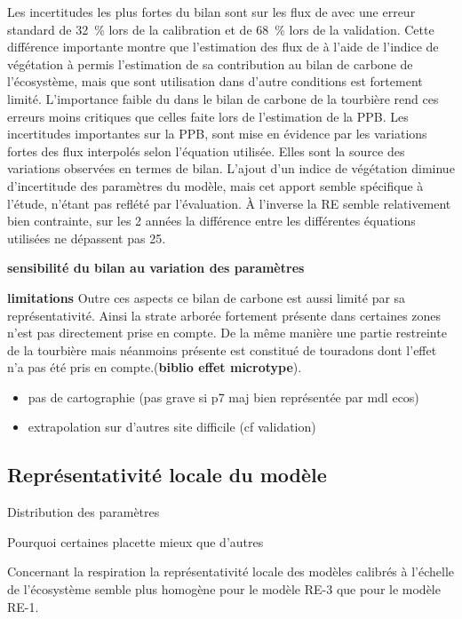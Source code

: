 Les incertitudes les plus fortes du bilan sont sur les flux de \chh avec une erreur standard de \SI{32}{\percent} lors de la calibration et de \SI{68}{\percent} lors de la validation.
Cette différence importante montre que l'estimation des flux de \chh à l'aide de l'indice de végétation à permis l'estimation de sa contribution au bilan de carbone de l'écosystème, mais que sont utilisation dans d'autre conditions est fortement limité.
L'importance faible du \chh dans le bilan de carbone de la tourbière rend ces erreurs moins critiques que celles faite lors de l'estimation de la PPB.
Les incertitudes importantes sur la PPB, sont mise en évidence par les variations fortes des flux interpolés selon l'équation utilisée.
Elles sont la source des variations observées en termes de bilan.
L'ajout d'un indice de végétation diminue d'incertitude des paramètres du modèle, mais cet apport semble spécifique à l'étude, n'étant pas reflété par l'évaluation.
À l'inverse la RE semble relativement bien contrainte, sur les 2 années la différence entre les différentes équations utilisées ne dépassent pas \SI{25}{\gcma}.

\textbf{sensibilité du bilan au variation des paramètres}

\textbf{limitations}
Outre ces aspects ce bilan de carbone est aussi limité par sa représentativité. 
Ainsi la strate arborée fortement présente dans certaines zones n'est pas directement prise en compte.
De la même manière une partie restreinte de la tourbière mais néanmoins présente est constitué de touradons dont l'effet n'a pas été pris en compte.\plop (\textbf{biblio effet microtype}).


\begin{itemize}
\item pas de cartographie (pas grave si p7 maj bien représentée par mdl ecos)
\item extrapolation sur d'autres site difficile (cf validation)
\end{itemize}

\subsection{Représentativité locale du modèle}

Distribution des paramètres

Pourquoi certaines placette mieux que d'autres

Concernant la respiration la représentativité locale des modèles calibrés à l'échelle de l'écosystème semble plus homogène pour le modèle RE-3 que pour le modèle RE-1.

